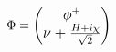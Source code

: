\begin{comment}
For instance, in the U(1) gauge transition, if one requires the invariance of electromagnetism by adding $\it{U}$(1) gauge, the Maxwell formalism naturally fits in the quantum electroweak dynamics (QED), along with the weak interaction which is invariant under not only $\it{U}$(1) transformation but also $\it{SU}$(2). The symmetry of electromagnetic force and weak force is spontaneously broken due to the non-zero expected value of Higgs field of the vacuum. That makes the coupling of different field varied so the carriers of electromagnetic field and weak field diverged. Massless particle $\gamma$ is carrying the electromagnetic force. $W^{+/-}$ and neutral $Z$ deliver the force of weak interaction. They have different coupling strength to the Higgs field, which excites a neutral particle, Higgs boson $H$. The quarks, however, not only coupling to $W^{+/-},Z$ by weak interaction, they directly interact with each other by exchanging gluons by strong force. The strong interaction is described by $SU$(3) with eight types of different gluons, and every gluon has 3 colors. The mechanism that describes this interaction is called ``quantum chromodynamics" (QCD). 

The contribution of the origin of $CP$ violation is mainly from the weak current in the SM Lagrangian. So the discussion of the theoretical interface of $CP$ violation will be focusing on the weak interaction. In the Lagrangian formalism in the SM, gauge interactions are described by the terms in the Lagrangian in a form that quark field is coupling with each other through gauge current, specifically the weak or neutral current. In order to keep the $SU$(2) symmetry treating the quarks from same generation equally, the weak eigenstates are introduced for presenting the Lagrangian. However, if we require the gauge bosons $W^{+/-}$ and $Z$ acquire mass from Yukawa coupling with Higgs field, the term that describes the weak interaction is spontaneously breaking under $CP$ operation. 

\end{comment}


 


\begin{equation}{\label{Eqn:higgs_field}}
\large
\Phi = 
\begin{pmatrix}
\phi^+\\
\nu + \frac{H+i\chi}{\sqrt{2}}
\end{pmatrix}
\end{equation}

